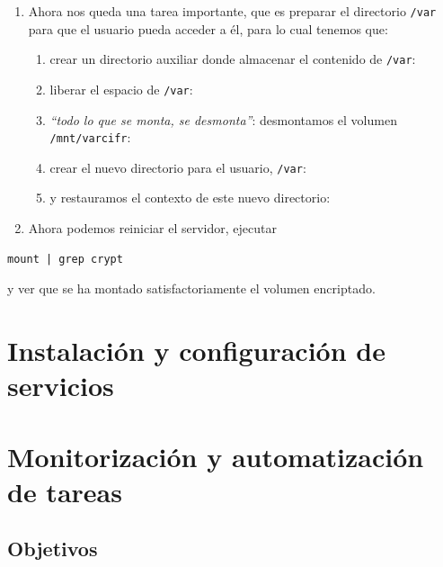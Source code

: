 \documentclass[
]{memoir}
\providecommand{\tightlist}{%
  \setlength{\itemsep}{0pt}\setlength{\parskip}{0pt}}
\begin{document}
\begin{enumerate}
\def\labelenumi{\arabic{enumi}.}
\setcounter{enumi}{13}
\tightlist
\item
  Ahora nos queda una tarea importante, que es preparar el directorio \texttt{/var} para que el usuario pueda acceder a él, para lo cual tenemos que:

  \begin{enumerate}
  \def\labelenumii{\alph{enumii}.}
  \tightlist
  \item
    crear un directorio auxiliar donde almacenar el contenido de \texttt{/var}:
  \item
    liberar el espacio de \texttt{/var}:
  \item
    \emph{``todo lo que se monta, se desmonta''}: desmontamos el volumen \texttt{/mnt/varcifr}:
  \item
    crear el nuevo directorio para el usuario, \texttt{/var}:
  \item
    y restauramos el contexto de este nuevo directorio:
  \end{enumerate}
\item
  Ahora podemos reiniciar el servidor, ejecutar
\end{enumerate}

\begin{verbatim}
mount | grep crypt
\end{verbatim}

y ver que se ha montado satisfactoriamente el volumen encriptado.

\hypertarget{instalaciuxf3n-y-configuraciuxf3n-de-servicios}{%
\chapter{Instalación y configuración de servicios}\label{instalaciuxf3n-y-configuraciuxf3n-de-servicios}}

\hypertarget{monitorizaciuxf3n-y-automatizaciuxf3n-de-tareas}{%
\chapter{Monitorización y automatización de tareas}\label{monitorizaciuxf3n-y-automatizaciuxf3n-de-tareas}}

\hypertarget{objetivos}{%
\section{Objetivos}\label{objetivos}}
\end{document}
